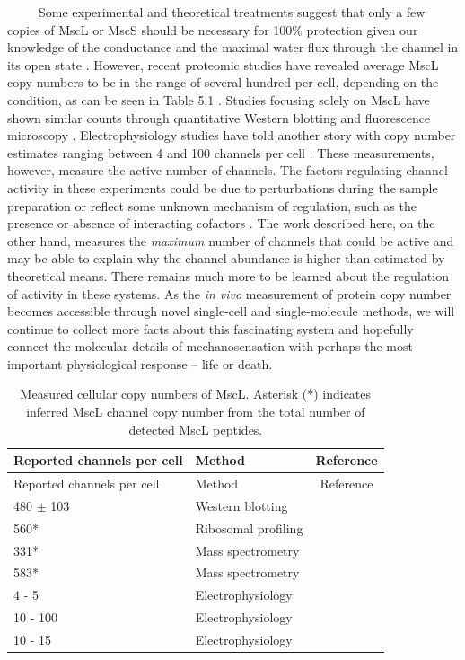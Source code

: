 \documentclass[12pt]{caltech_thesis}
\begin{document}
~~~~~Some experimental and theoretical treatments suggest that only a
few copies of MscL or MscS should be necessary for 100\% protection
given our knowledge of the conductance and the maximal water flux
through the channel in its open state
\autocite{louhivuori2010,booth2014}. However, recent proteomic studies
have revealed average MscL copy numbers to be in the range of several
hundred per cell, depending on the condition, as can be seen in Table
5.1 \autocite{li2014,schmidt2016,soufi2015}. Studies focusing solely on
MscL have shown similar counts through quantitative Western blotting and
fluorescence microscopy \autocite{bialecka-fornal2012}.
Electrophysiology studies have told another story with copy number
estimates ranging between 4 and 100 channels per cell
\autocite{blount1999,stokes2003,booth2005}. These measurements, however,
measure the active number of channels. The factors regulating channel
activity in these experiments could be due to perturbations during the
sample preparation or reflect some unknown mechanism of regulation, such
as the presence or absence of interacting cofactors
\autocite{schumann2010}. The work described here, on the other hand,
measures the \emph{maximum} number of channels that could be active and
may be able to explain why the channel abundance is higher than
estimated by theoretical means. There remains much more to be learned
about the regulation of activity in these systems. As the \emph{in vivo}
measurement of protein copy number becomes accessible through novel
single-cell and single-molecule methods, we will continue to collect
more facts about this fascinating system and hopefully connect the
molecular details of mechanosensation with perhaps the most important
physiological response -- life or death.

\begin{longtable}[]{@{}llc@{}}
\caption{Measured cellular copy numbers of MscL. Asterisk (*) indicates
inferred MscL channel copy number from the total number of detected MscL
peptides.}\tabularnewline
\toprule()
Reported channels per cell & Method & Reference \\
\midrule()
\endfirsthead
\toprule()
Reported channels per cell & Method & Reference \\
\midrule()
\endhead
480 \(\pm\) 103 & Western blotting & \textcite{bialecka-fornal2012} \\
560* & Ribosomal profiling & \textcite{li2014} \\
331* & Mass spectrometry & \textcite{schmidt2016} \\
583* & Mass spectrometry & \textcite{soufi2015} \\
4 - 5 & Electrophysiology & \textcite{stokes2003} \\
10 - 100 & Electrophysiology & \textcite{booth2005} \\
10 - 15 & Electrophysiology & \textcite{blount1999} \\
\bottomrule()
\end{longtable}
\end{document}
